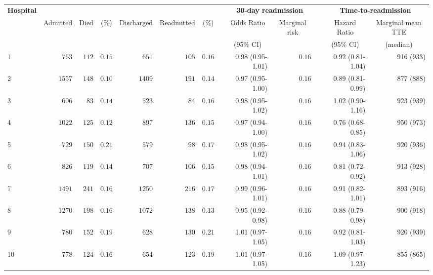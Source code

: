 \documentclass[]{article}\usepackage[]{graphicx}\usepackage[]{color}
\begin{document}

\begin{landscape}

\setmainfont[Scale=1]{Cambria}
\linespread{1}

\begin{table}[!tbp]
\begin{center}
\begin{tabular}{lrrrrrrcrrcrr}
\hline\hline
\multicolumn{1}{l}{\bfseries Hospital}&\multicolumn{6}{c}{\bfseries }&\multicolumn{1}{c}{\bfseries }&\multicolumn{2}{c}{\bfseries 30-day readmission}&\multicolumn{1}{c}{\bfseries }&\multicolumn{2}{c}{\bfseries Time-to-readmission}\tabularnewline
\cline{9-10} \cline{12-13}
\multicolumn{1}{l}{}&\multicolumn{1}{c}{Admitted}&\multicolumn{1}{c}{Died}&\multicolumn{1}{c}{(\%)}&\multicolumn{1}{c}{Discharged}&\multicolumn{1}{c}{Readmitted}&\multicolumn{1}{c}{(\%)}&\multicolumn{1}{c}{}&\multicolumn{1}{c}{Odds Ratio}&\multicolumn{1}{c}{Marginal risk}&\multicolumn{1}{c}{}&\multicolumn{1}{c}{Hazard Ratio}&\multicolumn{1}{c}{Marginal mean TTE}\tabularnewline
&&&&&&&&\multicolumn{1}{c}{{\scriptsize (95\% CI)}}&&&\multicolumn{1}{c}{{\scriptsize (95\% CI)}}&\multicolumn{1}{c}{{\scriptsize (median)}}\tabularnewline
\hline
1&$ 763$&$112$&$0.15$&$ 651$&$105$&$0.16$&&0.98 (0.95-1.01)&$0.16$&&0.92 (0.81-1.04)&916 (933)\tabularnewline
2&$1557$&$148$&$0.10$&$1409$&$191$&$0.14$&&0.97 (0.95-1.00)&$0.16$&&0.89 (0.81-0.99)&877 (888)\tabularnewline
3&$ 606$&$ 83$&$0.14$&$ 523$&$ 84$&$0.16$&&0.98 (0.95-1.02)&$0.16$&&1.02 (0.90-1.16)&923 (939)\tabularnewline
4&$1022$&$125$&$0.12$&$ 897$&$136$&$0.15$&&0.97 (0.94-1.00)&$0.16$&&0.76 (0.68-0.85)&950 (973)\tabularnewline
5&$ 729$&$150$&$0.21$&$ 579$&$ 98$&$0.17$&&0.98 (0.95-1.02)&$0.16$&&0.94 (0.83-1.06)&920 (936)\tabularnewline
6&$ 826$&$119$&$0.14$&$ 707$&$106$&$0.15$&&0.98 (0.94-1.01)&$0.16$&&0.81 (0.72-0.92)&913 (928)\tabularnewline
7&$1491$&$241$&$0.16$&$1250$&$216$&$0.17$&&0.99 (0.96-1.01)&$0.16$&&0.91 (0.82-1.01)&893 (916)\tabularnewline
8&$1270$&$198$&$0.16$&$1072$&$138$&$0.13$&&0.95 (0.92-0.98)&$0.16$&&0.88 (0.79-0.98)&900 (918)\tabularnewline
9&$ 780$&$152$&$0.19$&$ 628$&$130$&$0.21$&&1.01 (0.97-1.05)&$0.16$&&0.92 (0.81-1.03)&920 (939)\tabularnewline
10&$ 778$&$124$&$0.16$&$ 654$&$123$&$0.19$&&1.01 (0.97-1.05)&$0.16$&&1.09 (0.97-1.23)&855 (865)\tabularnewline

\end{tabular}
\end{center}
\end{table}
\end{landscape}
\end{document}
